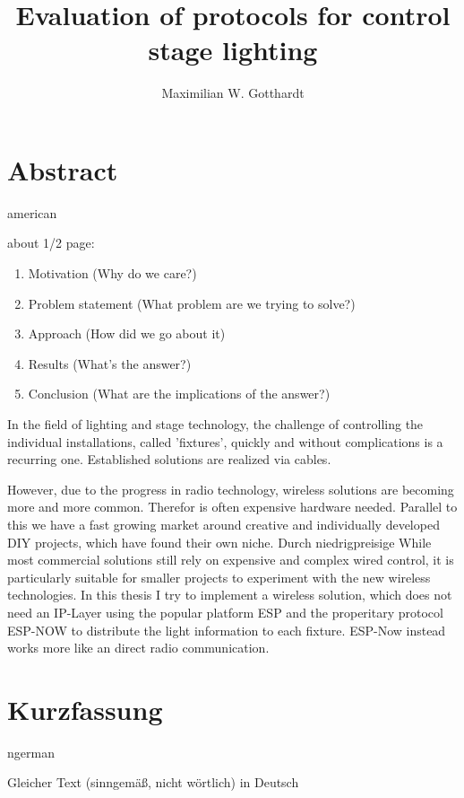 \documentclass[]{ccs-thesis}
\author{Maximilian W. Gotthardt}
\title{Evaluation of protocols for control stage lighting}
\begin{document}

\maketitle

\thispagestyle{empty}

\cleardoublepage

\chapter*{Abstract}
\begin{otherlanguage*}{american}

about 1/2 page:
\begin{enumerate}
	\item Motivation (Why do we care?)
	\item Problem statement (What problem are we trying to solve?)
	\item Approach (How did we go about it)
	\item Results (What's the answer?)
	\item Conclusion (What are the implications of the answer?)
\end{enumerate}
	

In the field of lighting and stage technology, the challenge of controlling the individual installations, called 'fixtures', quickly and without complications is a recurring one. Established solutions are realized via cables. 

However, due to the progress in radio technology, wireless solutions are becoming more and more common. Therefor is often expensive hardware needed.
Parallel to this we have a fast growing market around creative and individually developed DIY projects, which have found their own niche. Durch niedrigpreisige 
While most commercial solutions still rely on expensive and complex wired control, it is particularly suitable for smaller projects to experiment with the new wireless technologies. 
In this thesis I try to implement a wireless solution, which does not need an IP-Layer using the popular platform ESP and the properitary protocol ESP-NOW to distribute the light information to each fixture. 
ESP-Now instead works more like an direct radio communication.
	
\end{otherlanguage*}

\chapter*{Kurzfassung}
\begin{otherlanguage*}{ngerman}

Gleicher Text (sinngemäß, nicht wörtlich) in Deutsch

\end{otherlanguage*}
\acresetall
\end{document}
